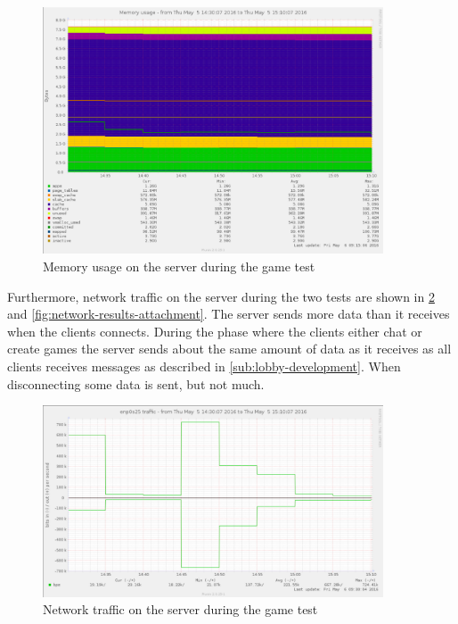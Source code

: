 \documentclass[a4paper]{article}
\begin{document}
\begin{figure}[H]
    \includegraphics[width=0.9\textwidth]{figure/serversidePerformance/2016-05-05-game-memory.png}
    \caption{Memory usage on the server during the game test}
    \label{fig:memory-results}
\end{figure}

Furthermore, network traffic on the server during the two tests are shown in \cref{fig:network-results} and \cref{fig:network-results-attachment}. The server sends more data than it receives when the clients connects. During the phase where the clients either chat or create games the server sends about the same amount of data as it receives as all clients receives messages as described in \cref{sub:lobby-development}. When disconnecting some data is sent, but not much.

\begin{figure}[H]
    \includegraphics[width=0.9\textwidth]{figure/serversidePerformance/2016-05-05-network-traffic-game.png}
    \caption{Network traffic on the server during the game test}
    
    \label{fig:network-results}
\end{figure}
\end{document}
